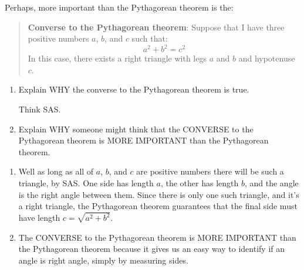 \documentclass[noauthor,nooutcomes,handout]{ximera}
\begin{document}
\begin{question}
  Perhaps, more important than the Pythagorean theorem is the:
  \begin{quote}
    \textbf{Converse to the Pythagorean theorem}:
    Suppose that I have three positive numbers $a$, $b$, and $c$ such that:
    \[
    a^2 + b^2 = c^2
    \]
    In this case, there exists a right triangle with legs $a$ and $b$
    and hypotenuse $c$.
  \end{quote}
  \begin{enumerate}
  \item Explain WHY the converse to the Pythagorean theorem is true.
    \begin{hint}
      Think SAS. 
    \end{hint}
  \item Explain WHY someone might think that the CONVERSE to the
    Pythagorean theorem is MORE IMPORTANT than the Pythagorean
    theorem.
  \end{enumerate}
    \begin{freeResponse}
      \begin{enumerate}
      \item Well as long as all of $a$, $b$, and $c$ are positive numbers there
        will be such a triangle, by SAS.  One side has length $a$, the
        other has length $b$, and the angle is the right angle between
        them. Since there is only one such triangle, and it's a right
        triangle, the Pythagorean theorem guarantees that the final side
        must have length $c = \sqrt{a^2+b^2}$.
      \item The CONVERSE to the Pythagorean theorem is MORE IMPORTANT
        than the Pythagorean theorem because it gives us an easy way
        to identify if an angle is right angle, simply by measuring
        sides.
      \end{enumerate}
      \end{freeResponse}
  
\end{question}
\end{document}
